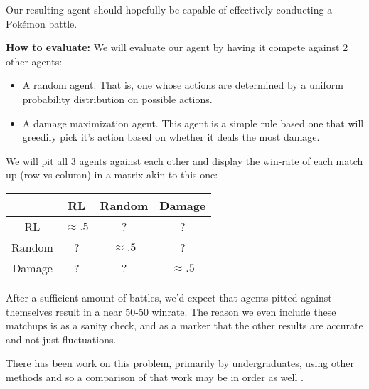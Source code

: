 \documentclass{article}
\begin{document}
\noindent Our resulting agent should hopefully be capable of effectively conducting a Pokémon battle.
\bigskip

\noindent\textbf{How to evaluate:} We will evaluate our agent by having it compete against 2 other agents:
\begin{itemize}
	\item A random agent. That is, one whose actions are determined by a uniform probability distribution on possible actions. 
	\item A damage maximization agent. This agent is a simple rule based one that will greedily pick it's action based on whether it deals the most damage.
\end{itemize}

We will pit all 3 agents against each other and display the win-rate of each match up (row vs column) in a matrix akin to this one:
\begin{center}
    \begin{tabular}{|c|c c c|} 
    \hline
    & RL & Random & Damage \\
    \hline 
    RL & $\approx.5$ & ? & ? \\
    \hline
    Random & ? & $\approx.5$ & ? \\ 
    \hline 
    Damage & ? & ? & $\approx.5$ \\ 
    \hline
   \end{tabular}
\end{center}

After a sufficient amount of battles, we'd expect that agents pitted against themselves result in a near 50-50 winrate. The reason we even include these matchups is as a sanity check, and as a marker that the other results are accurate and not just fluctuations.

There has been work on this problem, primarily by undergraduates, using other methods and so a comparison of that work may be in order as well \cite{r1} \cite{r2}.
\newpage
\end{document}
